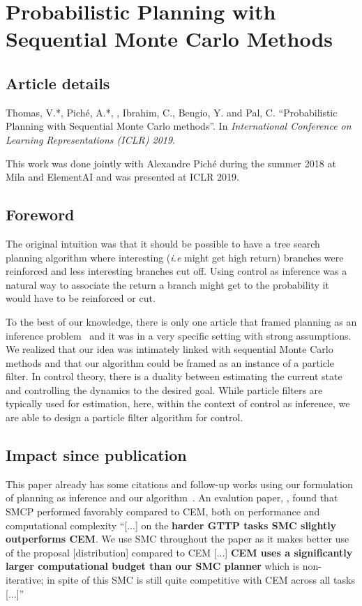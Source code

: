 \chapter{Probabilistic Planning with Sequential Monte Carlo Methods}
\label{chapter:smcp}
\section*{Article details}


Thomas, V.*, Piché, A.*, , Ibrahim, C., Bengio, Y. and Pal, C. ``Probabilistic Planning with Sequential Monte Carlo methods''. In \emph{International Conference on Learning Representations (ICLR) 2019}.

This work was done jointly with Alexandre Pich\'{e} during the summer 2018 at Mila and ElementAI and was presented at ICLR 2019. 
\section*{Foreword}
The original intuition was that it should be possible to have a tree search planning algorithm where interesting (\emph{i.e} might get high return) branches were reinforced and less interesting branches cut off. Using control as inference was a natural way to associate the return a branch might get to the probability it would have to be reinforced or cut.

To the best of our knowledge, there is only one article that framed planning as an inference problem~\citep{attias2003planning} and it was in a very specific setting with strong assumptions.
We realized that our idea was intimately linked with sequential Monte Carlo methods and that our algorithm could be framed as an instance of a particle filter.
In control theory, there is a duality between estimating the current state and controlling the dynamics to the desired goal. While particle filters are typically used for estimation, here, within the context of control as inference, we are able to design a particle filter algorithm for control.



\section*{Impact since publication}
This paper already has some citations and follow-up works using our formulation of planning as inference and our algorithm~\citep{wang2019dual, lioutas2022critic}. An evalution paper, \citep{byravan22eval}, found that SMCP performed favorably compared to CEM, both on performance and computational complexity
        ``[...] on the \textbf{harder GTTP tasks SMC slightly outperforms CEM}. We use SMC throughout the paper as it makes better use of the proposal [distribution] compared to CEM 
        [...]
        \textbf{CEM uses a significantly larger computational budget than our SMC planner} which is non-iterative; in spite of this SMC is still quite competitive with CEM across all tasks [...]''

